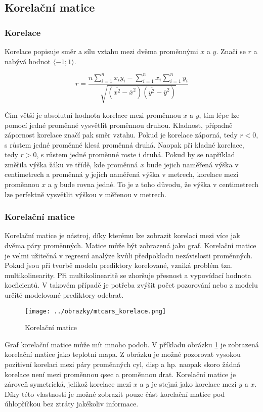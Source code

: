 {\color{red}
\subsection{Korelační matice}
\subsubsection{Korelace}
Korelace popisuje směr a sílu vztahu mezi dvěma proměnnými $x$ a $y$. Značí se $r$ a nabývá hodnot $\langle -1; 1 \rangle$.

\begin{equation}
r = \frac{n \sum_{i=1}^n x_i y_i - \sum_{i=1}^n x_i \sum_{i=1}^n y_i}
{\sqrt{(\overline{x^2} - \overline{x}^2)(\overline{y^2} - \overline{y}^2)}}
\end{equation}

Čím větší je absolutní hodnota korelace mezi proměnnou $x$ a $y$, tím lépe lze pomocí jedné proměnné vysvětlit proměnnou druhou. Kladnost, případně zápornost korelace
značí pak směr vztahu. Pokud je korelace záporná, tedy $r < 0$, s růstem jedné proměnné klesá proměnná druhá. Naopak při kladné korelace, tedy $r > 0$, s růstem
jedné proměnné roste i druhá. Pokud by se například změřila výška žáku ve třídě, kde proměnná $x$ bude jejich naměřená výška v centimetrech
a proměnná $y$ jejich naměřená výška v metrech, korelace mezi proměnnou $x$ a $y$ bude rovna jedné. To je z toho důvodu, že výška v centimetrech lze
perfektně vysvětlit výškou v měřenou v metrech.

\subsubsection{Korelační matice}
Korelační matice je nástroj, díky kterému lze zobrazit korelaci mezi více jak dvěma páry proměnných. Matice může být zobrazená jako 
graf. Korelační matice je velmi užitečná v regresní analýze kvůli předpokladu nezávislosti proměnných. Pokud jsou při tvorbě modelu prediktory korelované,
vzniká problém tzn. multikolinearity. Při multikolinearitě se zhoršuje přesnost a vypovídací hodnota koeficientů. \cite{Kleinbaum2010}
V takovém případě je potřeba zvýšit počet pozorování nebo z modelu určité modelované prediktory odebrat. 

\begin{figure}[H]
    \centering
    \texttt{[image: ../obrazky/mtcars\_korelace.png]}
    \caption{Korelační matice} 
    \label{fig:mtcars_korelace}
\end{figure}

Graf korelační matice může mít mnoho podob. V příkladu obrázku \ref{fig:mtcars_korelace} je zobrazená korelační matice jako teplotní mapa. Z obrázku je možné pozorovat vysokou
pozitivní korelaci mezi páry proměnných cyl, disp a hp. naopak skoro žádná korelace není mezi proměnnou qsec a proměnnou drat. Korelační matice je zároveň symetrická, jelikož
korelace mezi $x$ a $y$ je stejná jako korelace mezi $y$ a $x$. Díky této vlastnosti je možné zobrazit pouze část korelační matice pod úhlopříčkou bez ztráty jakékoliv informace.
}

